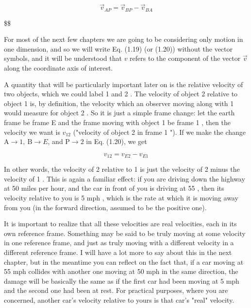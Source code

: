 \documentclass[10pt]{article}
\begin{document}
\begin{equation*}
\vec{v}_{A P}=\vec{v}_{B P}-\vec{v}_{B A} \tag{1.20}
\end{equation*}

\$\$

For most of the next few chapters we are going to be considering only motion in one dimension, and so we will write Eq. (1.19) (or (1.20)) without the vector symbols, and it will be understood that $v$ refers to the component of the vector $\vec{v}$ along the coordinate axis of interest.

A quantity that will be particularly important later on is the relative velocity of two objects, which we could label 1 and 2 . The velocity of object 2 relative to object 1 is, by definition, the velocity which an observer moving along with 1 would measure for object 2 . So it is just a simple frame change: let the earth frame be frame E and the frame moving with object 1 be frame 1 , then the velocity we want is $v_{12}$ ("velocity of object 2 in frame 1 "). If we make the change $\mathrm{A} \rightarrow 1, \mathrm{~B} \rightarrow E$, and $\mathrm{P} \rightarrow 2$ in Eq. (1.20), we get


\begin{equation*}
v_{12}=v_{E 2}-v_{E 1} \tag{1.21}
\end{equation*}


In other words, the velocity of 2 relative to 1 is just the velocity of 2 minus the velocity of 1 . This is again a familiar effect: if you are driving down the highway at 50 miles per hour, and the car in front of you is driving at 55 , then its velocity relative to you is 5 mph , which is the rate at which it is moving away from you (in the forward direction, assumed to be the positive one).

It is important to realize that all these velocities are real velocities, each in its own reference frame. Something may be said to be truly moving at some velocity in one reference frame, and just as truly moving with a different velocity in a different reference frame. I will have a lot more to say about this in the next chapter, but in the meantime you can reflect on the fact that, if a car moving at 55 mph collides with another one moving at 50 mph in the same direction, the damage will be basically the same as if the first car had been moving at 5 mph and the second one had been at rest. For practical purposes, where you are concerned, another car's velocity relative to yours is that car's "real" velocity.
\end{document}

